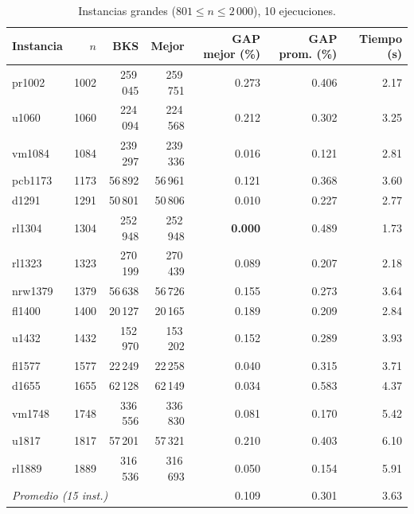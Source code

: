 \documentclass[runningheads]{llncs}
\begin{document}
\begin{table}
\caption{Instancias grandes ($801\le n\le 2\,000$), 10 ejecuciones.}
\label{tab:large}
\centering\scriptsize
\begin{tabular}{@{}lrrrrrr@{}}
\toprule
\textbf{Instancia} & $n$ & \textbf{BKS} & \textbf{Mejor} & \textbf{GAP mejor (\%)} & \textbf{GAP prom. (\%)} & \textbf{Tiempo (s)}\\
\midrule
pr1002 & 1002 & 259\,045 & 259\,751 & 0.273 & 0.406 & 2.17 \\
u1060 & 1060 & 224\,094 & 224\,568 & 0.212 & 0.302 & 3.25 \\
vm1084 & 1084 & 239\,297 & 239\,336 & 0.016 & 0.121 & 2.81 \\
pcb1173 & 1173 & 56\,892 & 56\,961 & 0.121 & 0.368 & 3.60 \\
d1291 & 1291 & 50\,801 & 50\,806 & 0.010 & 0.227 & 2.77 \\
rl1304 & 1304 & 252\,948 & 252\,948 & \textbf{0.000} & 0.489 & 1.73 \\
rl1323 & 1323 & 270\,199 & 270\,439 & 0.089 & 0.207 & 2.18 \\
nrw1379 & 1379 & 56\,638 & 56\,726 & 0.155 & 0.273 & 3.64 \\
fl1400 & 1400 & 20\,127 & 20\,165 & 0.189 & 0.209 & 2.84 \\
u1432 & 1432 & 152\,970 & 153\,202 & 0.152 & 0.289 & 3.93 \\
fl1577 & 1577 & 22\,249 & 22\,258 & 0.040 & 0.315 & 3.71 \\
d1655 & 1655 & 62\,128 & 62\,149 & 0.034 & 0.583 & 4.37 \\
vm1748 & 1748 & 336\,556 & 336\,830 & 0.081 & 0.170 & 5.42 \\
u1817 & 1817 & 57\,201 & 57\,321 & 0.210 & 0.403 & 6.10 \\
rl1889 & 1889 & 316\,536 & 316\,693 & 0.050 & 0.154 & 5.91 \\
\midrule
\multicolumn{4}{l}{\textit{Promedio (15 inst.)}} & 0.109 & 0.301 & 3.63 \\
\bottomrule
\end{tabular}
\end{table}
\end{document}

